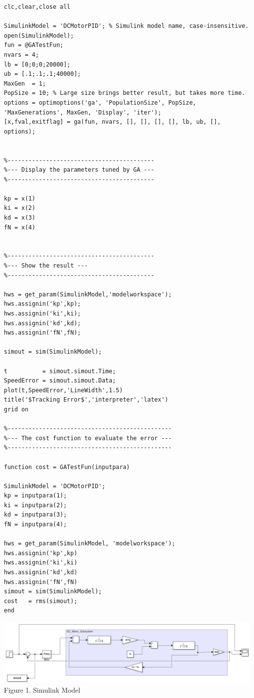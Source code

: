 \documentclass[8pt]{innovativeinnovation-cheatsheet}
\begin{document}
\begin{multicols*}{3}
\begin{lstlisting}
clc,clear,close all

SimulinkModel = 'DCMotorPID'; % Simulink model name, case-insensitive.
open(SimulinkModel);
fun = @GATestFun;
nvars = 4;
lb = [0;0;0;20000];
ub = [.1;.1;.1;40000];
MaxGen  = 1;
PopSize = 10; % Large size brings better result, but takes more time.
options = optimoptions('ga', 'PopulationSize', PopSize, 'MaxGenerations', MaxGen, 'Display', 'iter');
[x,fval,exitflag] = ga(fun, nvars, [], [], [], [], lb, ub, [], options);


%------------------------------------------
%--- Display the parameters tuned by GA ---
%------------------------------------------

kp = x(1)
ki = x(2)
kd = x(3)
fN = x(4)


%------------------------------------------
%--- Show the result ---
%------------------------------------------

hws = get_param(SimulinkModel,'modelworkspace');
hws.assignin('kp',kp);
hws.assignin('ki',ki);
hws.assignin('kd',kd);
hws.assignin('fN',fN);

simout = sim(SimulinkModel);

t          = simout.simout.Time;
SpeedError = simout.simout.Data;
plot(t,SpeedError,'LineWidth',1.5)
title('$Tracking Error$','interpreter','latex')
grid on

%-----------------------------------------------
%--- The cost function to evaluate the error ---
%-----------------------------------------------

function cost = GATestFun(inputpara)

SimulinkModel = 'DCMotorPID';
kp = inputpara(1);
ki = inputpara(2);
kd = inputpara(3);
fN = inputpara(4);

hws = get_param(SimulinkModel, 'modelworkspace');
hws.assignin('kp',kp)
hws.assignin('ki',ki)
hws.assignin('kd',kd)
hws.assignin('fN',fN)
simout = sim(SimulinkModel);
cost   = rms(simout);
end
\end{lstlisting}


\begin{center}
\includegraphics[width = \linewidth]{DCMotorSimulinkModel}
Figure 1. Simulink Model
\end{center}


\end{multicols*}
\end{document}
